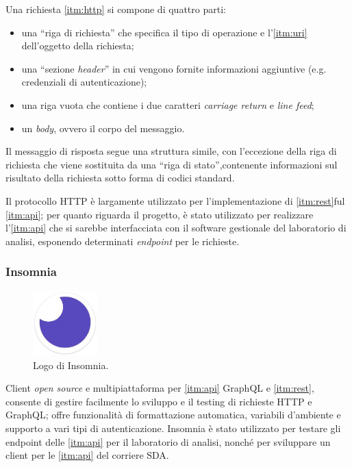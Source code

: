 Una richiesta \ref{itm:http} si compone di quattro parti:
\begin{itemize}
    \item una ``riga di richiesta'' che specifica il tipo di operazione e l'\ref{itm:uri} dell'oggetto della richiesta;
    \item una ``sezione \textit{header}'' in cui vengono fornite informazioni aggiuntive (e.g. credenziali di autenticazione);
    \item una riga vuota che contiene i due caratteri \textit{carriage return} e \textit{line feed};
    \item un \textit{body}, ovvero il corpo del messaggio.
\end{itemize}

Il messaggio di risposta segue una struttura simile, con l'eccezione della riga di richiesta che viene sostituita da una ``riga di stato'',contenente informazioni sul risultato della richiesta sotto forma di codici standard.

Il protocollo HTTP è largamente utilizzato per l'implementazione di \ref{itm:rest}ful \ref{itm:api}; per quanto riguarda il progetto, è stato utilizzato per realizzare l'\ref{itm:api} che si sarebbe interfacciata con il software gestionale del laboratorio di analisi, esponendo determinati \textit{endpoint} per le richieste.

\subsubsection{Insomnia}
\begin{figure}[h!]
    \centering
    \includegraphics[height=2.5cm]{figures/insomnia.jpg}
    \caption[Logo di Insomnia]{Logo di Insomnia.
    \label{fig:insomnia}}
\end{figure}
Client \textit{open source} e multipiattaforma per \ref{itm:api} GraphQL e \ref{itm:rest}, consente di gestire facilmente lo sviluppo e il testing di richieste HTTP e GraphQL; offre funzionalità di formattazione automatica, variabili d'ambiente e supporto a vari tipi di autenticazione. Insomnia è stato utilizzato per testare gli endpoint delle \ref{itm:api} per il laboratorio di analisi, nonché per sviluppare un client per le \ref{itm:api} del corriere SDA.

